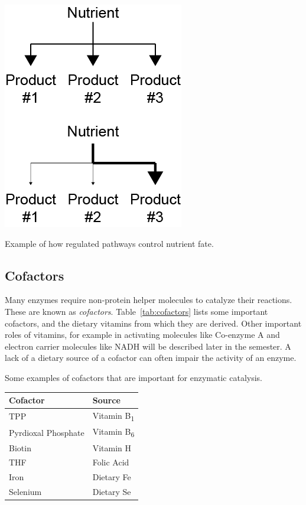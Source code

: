 \documentclass{tufte-handout}
\begin{document}
\begin{marginfigure}
\includegraphics[width=0.75\marginparwidth]{figures/nutrient-pathways.png}\
\caption{Example of how regulated pathways control nutrient fate.}\label{fig:nutrient-pathways}
\end{marginfigure}

\subsection{Cofactors}
Many enzymes require non-protein helper molecules to catalyze their reactions.  These are known as \emph{cofactors}.  Table~\ref{tab:cofactors} lists some important cofactors, and the dietary vitamins from which they are derived.  Other important roles of vitamins, for example in activating molecules like Co-enzyme A and electron carrier molecules like NADH will be described later in the semester.  A lack of a dietary source of a cofactor can often impair the activity of an enzyme.

\begin{margintable}
\caption{Some examples of cofactors that are important for enzymatic catalysis.}\label{tab:cofactors}
\begin{tabular}{@{}ll@{}}
 \textbf{Cofactor}  & \textbf{Source}           \\ \midrule
TPP & Vitamin B\textsubscript{1} \\
Pyrdioxal Phosphate & Vitamin B\textsubscript{6} \\
Biotin & Vitamin H \\
THF & Folic Acid \\
Iron &  Dietary Fe \\ 
Selenium & Dietary Se \\ \bottomrule
\end{tabular}
\end{margintable}
\end{document}
